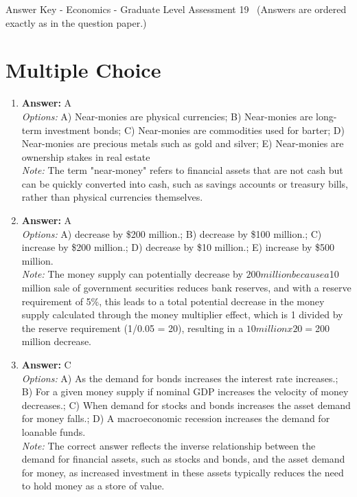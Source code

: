 \documentclass[12pt]{article}
\begin{document}
\begin{center}
Answer Key - Economics - Graduate Level Assessment 19 \
\small (Answers are ordered exactly as in the question paper.)
\end{center}

\section*{Multiple Choice}
\begin{enumerate}[label=\arabic*.]
\item \textbf{Answer:} A
\\ \textit{Options:} A) Near-monies are physical currencies; B) Near-monies are long-term investment bonds; C) Near-monies are commodities used for barter; D) Near-monies are precious metals such as gold and silver; E) Near-monies are ownership stakes in real estate
\\ \textit{Note:} The term "near-money" refers to financial assets that are not cash but can be quickly converted into cash, such as savings accounts or treasury bills, rather than physical currencies themselves.
\item \textbf{Answer:} A
\\ \textit{Options:} A) decrease by \$200 million.; B) decrease by \$100 million.; C) increase by \$200 million.; D) decrease by \$10 million.; E) increase by \$500 million.
\\ \textit{Note:} The money supply can potentially decrease by $200 million because a $10 million sale of government securities reduces bank reserves, and with a reserve requirement of 5\%, this leads to a total potential decrease in the money supply calculated through the money multiplier effect, which is 1 divided by the reserve requirement (1/0.05 = 20), resulting in a $10 million x 20 = $200 million decrease.
\item \textbf{Answer:} C
\\ \textit{Options:} A) As the demand for bonds increases the interest rate increases.; B) For a given money supply if nominal GDP increases the velocity of money decreases.; C) When demand for stocks and bonds increases the asset demand for money falls.; D) A macroeconomic recession increases the demand for loanable funds.
\\ \textit{Note:} The correct answer reflects the inverse relationship between the demand for financial assets, such as stocks and bonds, and the asset demand for money, as increased investment in these assets typically reduces the need to hold money as a store of value.

\end{enumerate}
\end{document}

